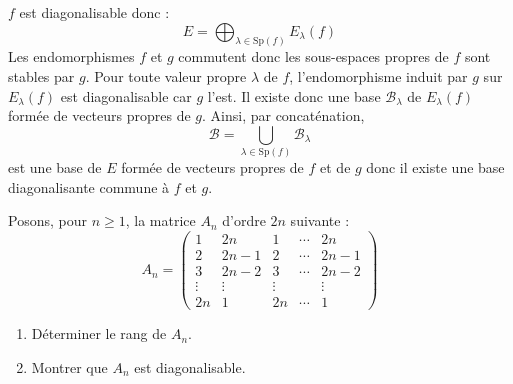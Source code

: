 \documentclass[a4paper,10pt]{report}
\begin{document}
\corr $f$ est diagonalisable donc :
$$ E = \bigoplus_{\lambda \in \textrm{Sp}(f)} E_{\lambda}(f)$$
Les endomorphismes $f$ et $g$ commutent donc les sous-espaces propres de $f$ sont stables par $g$. Pour toute valeur propre $\lambda$ de $f$, l'endomorphisme induit par $g$ sur $E_{\lambda}(f)$ est diagonalisable car $g$ l'est. Il existe donc une base $\mathcal{B}_{\lambda}$ de $E_{\lambda}(f)$ formée de vecteurs propres de $g$. Ainsi, par concaténation,
$$ \mathcal{B} = \bigcup_{\lambda  \in \textrm{Sp}(f)} \mathcal{B}_{\lambda}$$
est une base de $E$ formée de vecteurs propres de $f$ et de $g$ donc il existe une base diagonalisante commune à $f$ et $g$.

\begin{Exa} Posons, pour $n \geq 1$, la matrice $A_n$ d'ordre $2n$ suivante :
$$ A_n = \begin{pmatrix}
1 & 2n & 1 & \cdots & 2n \\
2 & 2n-1 & 2 & \cdots & 2n-1 \\
3 & 2n-2 & 3 & \cdots & 2n-2 \\
\vdots & \vdots & \vdots &  & \vdots \\
2n & 1 & 2n & \cdots & 1
\end{pmatrix}$$

\begin{enumerate}
\item Déterminer le rang de $A_n$.
\item Montrer que $A_n$ est diagonalisable.
\end{enumerate}
\end{Exa}

\corr 
\end{document}
